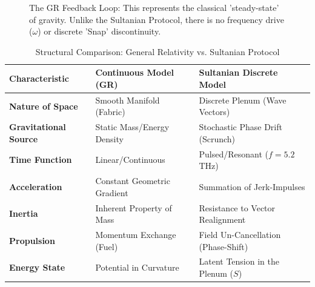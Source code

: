 \documentclass[11pt]{article}
\begin{document}
\begin{figure}[h!]
\centering
{}
\caption{The GR Feedback Loop: This represents the classical 'steady-state' of gravity. Unlike the Sultanian Protocol, there is no frequency drive ($\omega$) or discrete 'Snap' discontinuity.}
\label{fig:gr_feedback_final}
\end{figure}


\begin{table}[h!]
\centering
\caption{Structural Comparison: General Relativity vs. Sultanian Protocol}
\label{tab:model_comparison}
\begin{tabular}{@{}lll@{}}
\toprule
\textbf{Characteristic} & \textbf{Continuous Model (GR)} & \textbf{Sultanian Discrete Model}  \\ \hline
\textbf{Nature of Space}  & Smooth Manifold (Fabric) & Discrete Plenum (Wave Vectors) \\ 
\textbf{Gravitational Source}  & Static Mass/Energy Density & Stochastic Phase Drift (Scrunch) \\
\textbf{Time Function}  & Linear/Continuous & Pulsed/Resonant ($f = 5.2$ THz) \\ 
\textbf{Acceleration}   & Constant Geometric Gradient & Summation of Jerk-Impulses \\
\textbf{Inertia}   & Inherent Property of Mass & Resistance to Vector Realignment \\
\textbf{Propulsion}  & Momentum Exchange (Fuel) & Field Un-Cancellation (Phase-Shift) \\
\textbf{Energy State}  & Potential in Curvature & Latent Tension in the Plenum ($S$) \\ \hline
\end{tabular}
\end{table}
\end{document}
